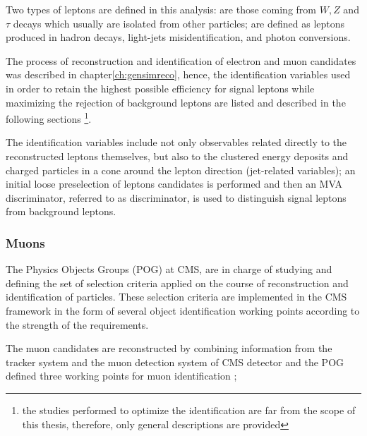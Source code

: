 Two types of leptons are defined in this analysis:  are those coming from $W, Z$ and $\tau$ decays which usually are isolated from other particles;  are defined as leptons produced in \bjet hadron decays, light-jets misidentification, and photon conversions. 

The process of reconstruction and identification of electron and muon candidates was described in chapter\ref{ch:gensimreco}, hence, the identification variables used in order to retain the highest possible efficiency for signal leptons while maximizing the rejection of background leptons are listed and described in the following sections \footnote{the studies performed to optimize the identification are far from the scope of this thesis, therefore, only general descriptions are provided}.

The identification variables include not only observables related directly to the reconstructed leptons themselves, but also to the clustered energy deposits and charged particles in a cone around the lepton direction (jet-related variables); an initial loose preselection of leptons candidates is performed and then an MVA discriminator, referred to as  discriminator, is used to distinguish signal leptons from background leptons.

\subsubsection*{Muons}

The Physics Objects Groups (POG) at CMS, are in charge of studying and defining the set of selection criteria applied on the course of reconstruction and identification of particles. These selection criteria are implemented in the CMS framework in the form of several object identification working points according to the strength of the requirements.

The muon candidates are reconstructed by combining information from the tracker system and the muon detection system of CMS detector and the POG defined three working points for muon identification \cite{muid};

